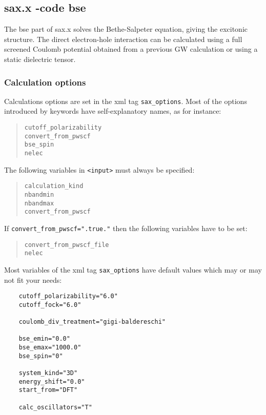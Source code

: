 \documentclass[11pt]{article}
\begin{document}
\subsection{sax.x -code bse}
The bse part of sax.x solves the Bethe-Salpeter equation, giving the excitonic structure. The direct electron-hole interaction can be calculated using a full screened Coulomb potential obtained from a previous GW calculation or using a static dielectric tensor.
\subsubsection{Calculation options}
Calculations options are set in the xml tag \texttt{sax\_options}.
Most of the options introduced by keywords
have self-explanatory names, as for instance:

\begin{quote}
  \texttt{cutoff\_polarizability}\\ 
  \texttt{convert\_from\_pwscf}\\
  \texttt{bse\_spin}\\ 
  \texttt{nelec} 
\end{quote}

The following variables in \texttt{<input>} must always be
specified:
\begin{quote}
  \texttt{calculation\_kind}\\
  \texttt{nbandmin}\\
  \texttt{nbandmax}\\
  \texttt{convert\_from\_pwscf}\\
\end{quote}
If \texttt{convert\_from\_pwscf=".true."} then the following variables have to be set:
\begin{quote}
  \texttt{convert\_from\_pwscf\_file}\\
  \texttt{nelec}\\
\end{quote}

Most variables of the xml tag \texttt{sax\_options} have default values which may or may not fit your needs:
\begin{verbatim}
    cutoff_polarizability="6.0"
    cutoff_fock="6.0"

    coulomb_div_treatment="gigi-baldereschi"

    bse_emin="0.0"
    bse_emax="1000.0"
    bse_spin="0"

    system_kind="3D"
    energy_shift="0.0"
    start_from="DFT"

    calc_oscillators="T"
\end{verbatim}
\end{document}
